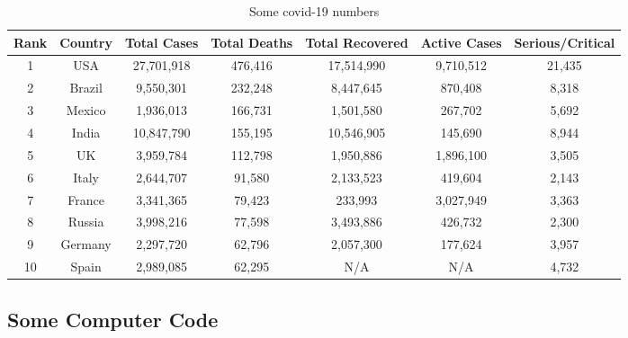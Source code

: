 \documentclass[10pt,letterpaper,twoside,final]{memoir}
\begin{document}
\begin{table}

\hspace{0in}\begin{tabular}{ccccccc}
\toprule[1pt]
Rank & Country & Total Cases & Total Deaths & Total Recovered & Active Cases & Serious/Critical	\\
\toprule[1pt]
  1  & USA     & 27,701,918  &  476,416	    & 17,514,990      & 9,710,512    &  21,435	        \\
  2  & Brazil  &  9,550,301  &  232,248	    &  8,447,645      &   870,408    &   8,318	        \\
  3  & Mexico  &  1,936,013  &  166,731     &  1,501,580      &   267,702    &   5,692	        \\
  4  & India   & 10,847,790  &  155,195	    & 10,546,905      &   145,690    &   8,944   	\\
  5  & UK      &  3,959,784  &  112,798	    &  1,950,886      & 1,896,100    &   3,505	        \\
  6  & Italy   &  2,644,707  &   91,580     &  2,133,523      &   419,604    &   2,143	        \\
  7  & France  &  3,341,365  &   79,423	    &    233,993      & 3,027,949    &   3,363	        \\
  8  & Russia  &  3,998,216  &   77,598     &  3,493,886      &   426,732    &   2,300	        \\
  9  & Germany &  2,297,720  &   62,796	    &  2,057,300      &   177,624    &   3,957	        \\
  10 & Spain   &  2,989,085  &   62,295     &	 N/A          &     N/A	     &   4,732	        \\
\bottomrule[1pt]
\end{tabular}

\caption{\label{tab:covidnums}Some covid-19 numbers}

\end{table}


\lipsum[2]

\subsection{Some Computer Code}

\lipsum[20-21]
\end{document}
